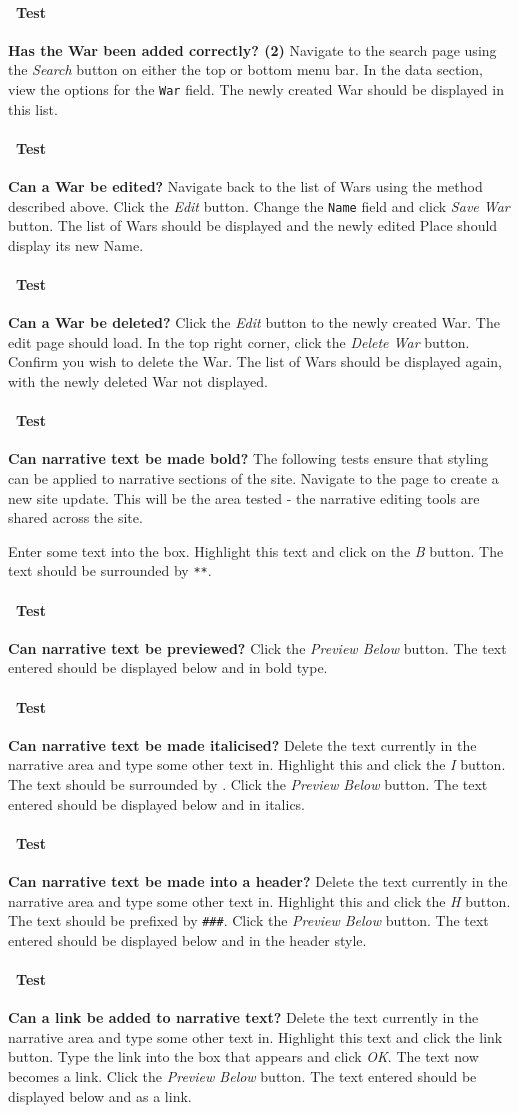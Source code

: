 \documentclass[12pt]{article}
\newcounter{Test}
\newcommand{\test}[1]{%
\stepcounter{Test}%
\paragraph{\Circle\ Test \theTest} \textbf{#1} }
\begin{document}
\test{Has the War been added correctly? (2)}
Navigate to the search page using the \textit{Search} button on either the top or bottom menu bar. In the data section, view the options for the \texttt{War} field. The newly created War should be displayed in this list.

\test{Can a War be edited?}
Navigate back to the list of Wars using the method described above. Click the \textit{Edit} button. Change the \texttt{Name} field and click \textit{Save War} button. The list of Wars should be displayed and the newly edited Place should display its new Name.

\test{Can a War be deleted?}
Click the \textit{Edit} button to the newly created War. The edit page should load. In the top right corner, click the \textit{Delete War} button. Confirm you wish to delete the War. The list of Wars should be displayed again, with the newly deleted War not displayed.

\test{Can narrative text be made bold?}
The following tests ensure that styling can be applied to narrative sections of the site. Navigate to the page to create a new site update. This will be the area tested - the narrative editing tools are shared across the site.

Enter some text into the box. Highlight this text and click on the \textit{B} button. The text should be surrounded by \texttt{\**\**}.

\test{Can narrative text be previewed?}
Click the \textit{Preview Below} button. The text entered should be displayed below and in bold type.

\test{Can narrative text be made italicised?}
Delete the text currently in the narrative area and type some other text in. Highlight this and click the \textit{I} button. The text should be surrounded by \texttt{\textunderscore}. Click the \textit{Preview Below} button. The text entered should be displayed below and in italics.

\test{Can narrative text be made into a header?}
Delete the text currently in the narrative area and type some other text in. Highlight this and click the \textit{H} button. The text should be prefixed by \texttt{\#\#\#}. Click the \textit{Preview Below} button. The text entered should be displayed below and in the header style.

\test{Can a link be added to narrative text?}
Delete the text currently in the narrative area and type some other text in. Highlight this text and click the link button. Type the link into the box that appears and click \textit{OK}. The text now becomes a link. Click the \textit{Preview Below} button. The text entered should be displayed below and as a link.
\end{document}
